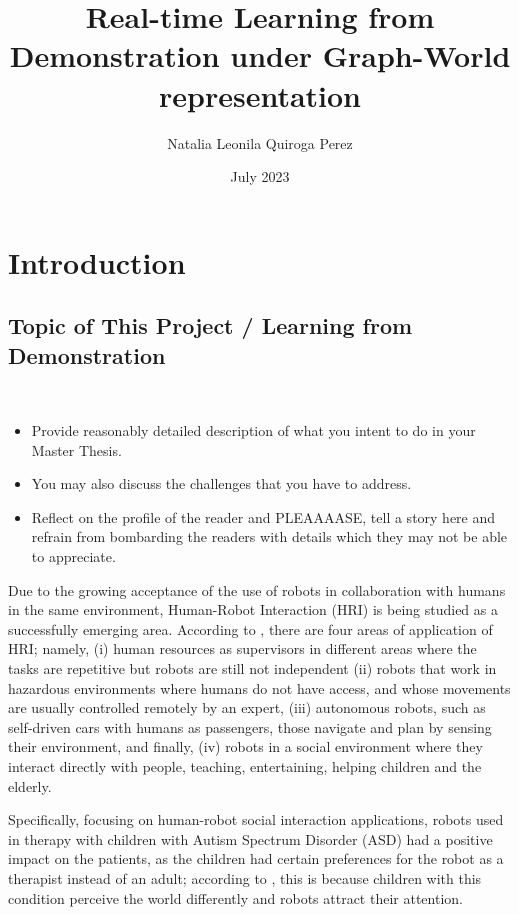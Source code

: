 \documentclass[thesis]{mas_proposal}
\title{Real-time Learning from Demonstration under Graph-World representation}
\author{Natalia Leonila Quiroga Perez}
\date{July 2023}
\begin{document}
\maketitle

\pagestyle{plain}

\section{Introduction}

\subsection{Topic of This  Project / Learning from Demonstration }\
\begin{itemize}
    \item Provide reasonably detailed description of what you intent to do in your Master Thesis.
    \item You may also discuss the challenges that you have to address.
    \item Reflect on the profile of the reader and PLEAAAASE, tell a story here and refrain from bombarding the readers with details which they may not be able to appreciate.
\end{itemize}

    Due to the growing acceptance of the use of robots in collaboration with humans in the same environment, Human-Robot Interaction (HRI) is being studied as a successfully emerging area. According to \cite{Sheridan2016}, there are four areas of application of HRI; namely, (i) human resources as supervisors in different areas where the tasks are repetitive but robots are still not independent (ii) robots that work in hazardous environments where humans do not have access, and whose movements are usually controlled remotely by an expert, (iii) autonomous robots, such as self-driven cars with humans as passengers, those navigate and plan by sensing their environment, and finally, (iv) robots in a social environment where they interact directly with people, teaching, entertaining, helping children and the elderly.
    
    Specifically, focusing on human-robot social interaction applications, robots used in therapy with children with Autism Spectrum Disorder (ASD) had a positive impact on the patients, as the children had certain preferences for the robot as a therapist instead of an adult; according to \cite{Prabha2019}, this is because children with this condition perceive the world differently and robots attract their attention.
    
\end{document}
